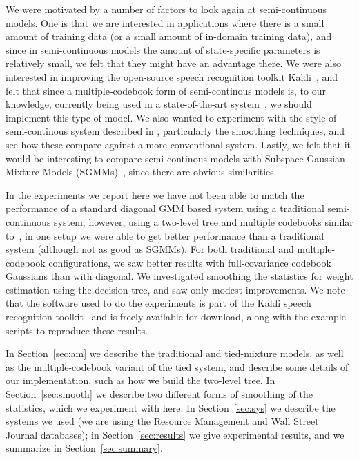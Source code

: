 \documentclass{article}
\begin{document}
We were motivated by a number of factors to look again at semi-continuous models.
One is that we are interested in applications where there is a small amount
of training data (or a small amount of in-domain training data), and since
in semi-continuous models the amount of state-specific parameters is relatively
small, we felt that they might have an advantage there.  We were also interested
in improving the open-source speech recognition toolkit {\sc Kaldi}~\cite{povey2011tks},
and felt that since a multiple-codebook form of semi-continous models is, to
our knowledge, currently being used in a state-of-the-art system~\cite{prasad2004t2b},
we should implement this type of model.  We also wanted to experiment with
the style of semi-continous system described 
in \cite{schukattalamazzini1994srf,schukattalamazzini1995as}, particularly the smoothing
techniques, and see how these compare against a more conventional system.
Lastly, we felt that it would be interesting to compare semi-continous
models with Subspace Gaussian Mixture Models (SGMMs)~\cite{povey2011sgm}, since
there are obvious similarities.

In the experiments we report here we have not been able to match the performance of
a standard diagonal GMM based system using a traditional semi-continuous system;
however, using a two-level tree and multiple codebooks similar to~\cite{prasad2004t2b},
in one setup we were able to get better performance than a traditional system (although not
as good as SGMMs).  For both traditional and multiple-codebook configurations,
we saw better results with full-covariance codebook Gaussians than with diagonal.
We investigated smoothing the statistics for weight estimation using the decision
tree, and saw only modest improvements.
We note that the software used to do the experiments is part of the {\sc Kaldi} speech
recognition toolkit~\cite{povey2011tks} and is freely available for download, along with the
example scripts to reproduce these results.

In Section~\ref{sec:am} we describe the traditional and tied-mixture models,
as well as the multiple-codebook variant of the tied system, and describe some
details of our implementation, such as how we build the two-level tree.
In Section~\ref{sec:smooth} we describe two different forms of smoothing of the statistics,
which we experiment with here.  
In Section~\ref{sec:sys} we describe the systems we used (we are using
the Resource Management and Wall Street Journal databases);
in Section~\ref{sec:results} we give experimental results, and we
summarize in Section~\ref{sec:summary}.
\end{document}
